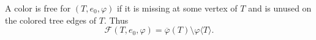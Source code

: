 \begin{definition}
A color is free for $(T,e_0,\varphi)$ if it is missing at some vertex of
$T$ and is unused on the colored tree edges of $T$.  Thus
\[
 \mathcal F(T,e_0,\varphi)
   =\overline\varphi(T)\setminus\varphi\langle T\rangle.
\]
\end{definition}
